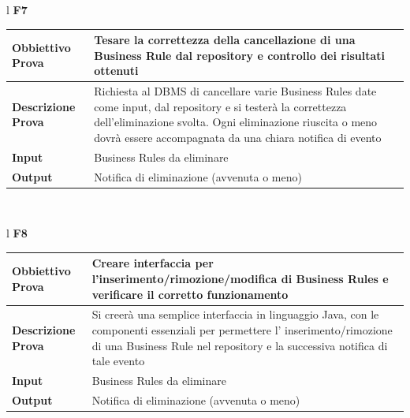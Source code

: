 \documentclass[11pt,titlepage,a4paper]{report}
\begin{document}
\begin{table}[hbtp]
\begin{tabular}{l}
\textbf{\textsf{F7}} \\
\begin{tabular}{||p{4.5cm}||p{7.5cm}||} \hline
{\textbf {Obbiettivo Prova}}& Tesare la correttezza della cancellazione di una Business Rule dal repository e controllo dei risultati ottenuti\\ \hline
{\textbf{Descrizione Prova}}&  Richiesta al DBMS di cancellare varie Business Rules date come input, dal repository e si tester\`a la correttezza dell'eliminazione svolta. Ogni eliminazione riuscita o meno dovr\`a essere accompagnata da una chiara notifica di evento\\ \hline
{\textbf{Input}}& Business Rules da eliminare \\ \hline
{\textbf{Output}}& Notifica di eliminazione (avvenuta o meno) \\ \hline
\end{tabular} \\
\end{tabular}
\end{table}
\begin{table}[hbtp]
\begin{tabular}{l}
\textbf{\textsf{F8}} \\
\begin{tabular}{||p{4.5cm}||p{7.5cm}||} \hline
{\textbf {Obbiettivo Prova}}& Creare interfaccia per l'inserimento/rimozione/modifica di Business Rules e verificare il corretto funzionamento\\ \hline
{\textbf{Descrizione Prova}}& Si creer\`a  una semplice interfaccia in linguaggio Java, con le componenti essenziali per permettere l' inserimento/rimozione di una Business Rule nel repository e la successiva notifica di tale evento \\ \hline
{\textbf{Input}}& Business Rules da eliminare \\ \hline
{\textbf{Output}}& Notifica di eliminazione (avvenuta o meno) \\ \hline
\end{tabular} \\
\end{tabular}
\end{table}
\end{document}
